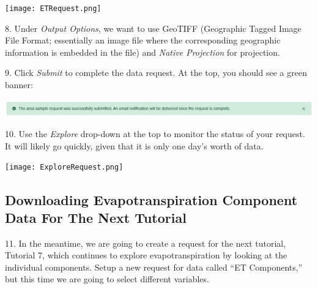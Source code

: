 \documentclass[oneside,a4paper,11pt,explicit]{book}
\begin{document}
\centerline{\texttt{[image: ETRequest.png]}}


8. Under \textit{Output Options}, we want to use GeoTIFF (Geographic Tagged Image File Format; essentially an image file where the corresponding geographic information is embedded in the file) and \textit{Native Projection} for projection.

9. Click \textit{Submit} to complete the data request. At the top, you should see a green banner:

\vspace{.5em}

\centerline{\includegraphics[width=\textwidth]{RequestSuccess.png}}

\vspace{.5em}

10. Use the \textit{Explore} drop-down at the top to monitor the status of your request. It will likely go quickly, given that it is only one day's worth of data.

\vspace{.5em}

\centerline{\texttt{[image: ExploreRequest.png]}}

\vspace{.5em}

\subsection{Downloading Evapotranspiration Component Data For The Next Tutorial}

11. In the meantime, we are going to create a request for the next tutorial, Tutorial 7, which continues to explore evapotranspiration by looking at the individual components. Setup a new request for data called ``ET Components,'' but this time we are going to select different variables. 
\end{document}
